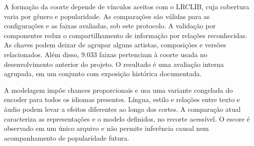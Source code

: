 
A formação da coorte depende de vínculos aceitos com o LRCLIB, cuja cobertura varia por gênero e popularidade. As comparações são válidas para as configurações e as faixas avaliadas, sob este protocolo. A validação por componentes reduz o compartilhamento de informação por relações reconhecidas. As chaves podem deixar de agrupar alguns artistas, composições e versões relacionados. Além disso, 9.033 faixas pertenciam à coorte usada no desenvolvimento anterior do projeto. O resultado é uma avaliação interna agrupada, em um conjunto com exposição histórica documentada.

A modelagem impõe chances proporcionais e usa uma variante congelada do encoder para todos os idiomas presentes. Língua, estilo e relações entre texto e áudio podem levar a efeitos diferentes ao longo dos cortes. A comparação atual caracteriza as representações e o modelo definidos, no recorte acessível. O escore é observado em um único arquivo e não permite inferência causal nem acompanhamento de popularidade futura.

